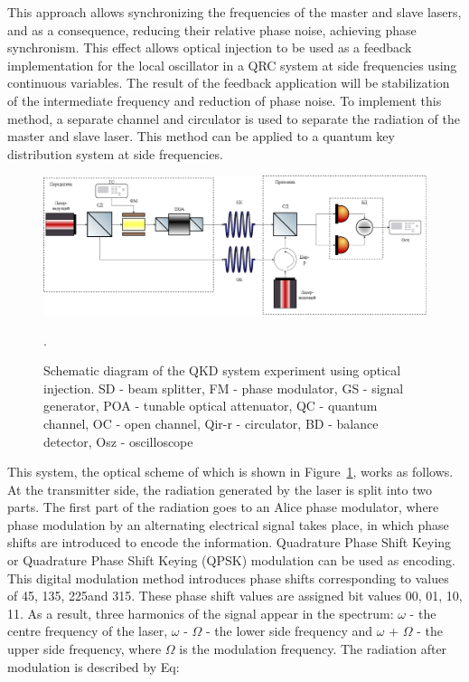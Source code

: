 This approach allows synchronizing the frequencies of the master and slave lasers, and as a consequence, reducing their relative phase noise, achieving phase synchronism. This effect allows optical injection to be used as a feedback implementation for the local oscillator in a QRC system at side frequencies using continuous variables. The result of the feedback application will be stabilization of the intermediate frequency and reduction of phase noise. To implement this method, a separate channel and circulator is used to separate the radiation of the master and slave laser. 
This method can be applied to a quantum key distribution system at side frequencies.
\begin{figure}
    \centering
    \includegraphics[width=\textwidth]{images/Схема с обратной связью.png}
    \caption{Schematic diagram of the QKD system experiment using optical injection. SD - beam splitter, FM - phase modulator, GS - signal generator, POA - tunable optical attenuator, QC - quantum channel, OC - open channel, Qir-r - circulator, BD - balance detector, Osz - oscilloscope}.
    \label{fig:opt inj scheme syn}
\end{figure}
This system, the optical scheme of which is shown in Figure~\ref{fig:opt inj scheme syn}, works as follows. At the transmitter side, the radiation generated by the laser is split into two parts. The first part of the radiation goes to an Alice phase modulator, where phase modulation by an alternating electrical signal takes place, in which phase shifts are introduced to encode the information. Quadrature Phase Shift Keying or Quadrature Phase Shift Keying (QPSK) modulation can be used as encoding. This digital modulation method introduces phase shifts corresponding to values of 45\textdegree, 135\textdegree, 225\textdegree and 315\textdegree. These phase shift values are assigned bit values {00, 01, 10, 11}. As a result, three harmonics of the signal appear in the spectrum: $\omega$ - the centre frequency of the laser, $\omega$ - $\Omega$ - the lower side frequency and $\omega$ + $\Omega$ - the upper side frequency, where $\Omega$ is the modulation frequency. The radiation after modulation is described by Eq:
